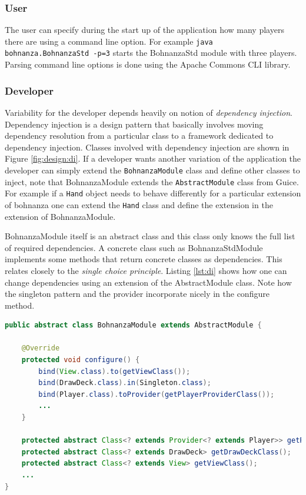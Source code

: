 \subsubsection{User}
The user can specify during the start up of the application how many players there are using a
command line option. For example \texttt{java bohnanza.BohnanzaStd -p=3} starts the BohnanzaStd
module with three players. Parsing command line options is done using the Apache Commons CLI library.

\subsubsection{Developer}
Variability for the developer depends heavily on notion of \emph{dependency injection}. Dependency
injection is a design pattern that basically involves moving dependency resolution from a particular
class to a framework dedicated to dependency injection. Classes involved with dependency injection are shown in
Figure \ref{fig:design:di}. If a developer wants another variation of the application the developer can simply extend the
\texttt{BohnanzaModule} class and define other classes to inject, note that BohnanzaModule
extends the \texttt{AbstractModule} class from Guice. For example if a \texttt{Hand} object needs
to behave differently for a particular extension of bohnanza one can extend the \texttt{Hand} class and
define the extension in the extension of BohnanzaModule. 

BohnanzaModule itself is
an abstract class and this class only knows the full list of required dependencies. A concrete class
such as BohnanzaStdModule implements some methods that return concrete classes as
dependencies. This relates closely to the \emph{single choice principle}. Listing \ref{lst:di} shows how one can change dependencies using
an extension of the AbstractModule class. Note how the singleton pattern and the provider incorporate nicely in the configure method.

\begin{lstlisting}[language=Java, caption=BohnanzaModule.java, label=lst:di]
public abstract class BohnanzaModule extends AbstractModule {

    @Override
    protected void configure() {
        bind(View.class).to(getViewClass());
        bind(DrawDeck.class).in(Singleton.class);
        bind(Player.class).toProvider(getPlayerProviderClass());
        ...
    }

    protected abstract Class<? extends Provider<? extends Player>> getPlayerProviderClass();
    protected abstract Class<? extends DrawDeck> getDrawDeckClass();
    protected abstract Class<? extends View> getViewClass();    
    ...
}
\end{lstlisting}

